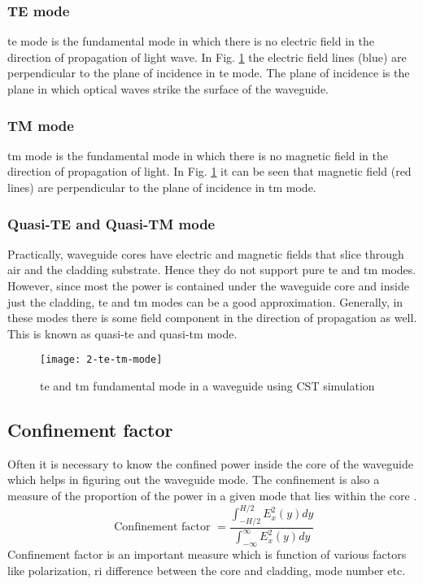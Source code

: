 \documentclass[../report.tex]{subfiles}
\begin{document}
			\subsubsection{TE mode}
\gls{te} mode is the fundamental mode in which there is no electric field in the direction of propagation of light wave. In Fig. \ref{fig:2_te_tm_mode} the electric field lines (blue) are perpendicular to the plane of incidence in \gls{te} mode. The plane of incidence is the plane in which optical waves strike the surface of the waveguide.						
			\subsubsection{TM mode}
\gls{tm} mode is the fundamental mode in which there is no magnetic field in the direction of propagation of light. In Fig. \ref{fig:2_te_tm_mode} it can be seen that magnetic field (red lines) are perpendicular to the plane of incidence in \gls{tm} mode.
 
			\subsubsection{Quasi-TE and Quasi-TM mode}				
Practically, waveguide cores have electric and magnetic fields that slice through air and the cladding substrate. Hence they do not support pure \gls{te} and \gls{tm} modes. However, since most the power is contained under the waveguide core and inside just the cladding, \gls{te} and \gls{tm} modes can be a good approximation. Generally, in these modes there is some field component in the direction of propagation as well. This is known as quasi-\gls{te} and quasi-\gls{tm} mode.

\begin{figure}[H]
	\centering
	\texttt{[image: 2-te-tm-mode]}
	\caption{\gls{te} and \gls{tm} fundamental mode in a waveguide using CST simulation}
	\label{fig:2_te_tm_mode}
\end{figure}
			
		\subsection{Confinement factor}
Often it is necessary to know the confined power inside the core of the waveguide which helps in figuring out the waveguide mode. The confinement is also a measure of the proportion of the power in a given mode that lies within the core \cite{reed_silicon_2008}.  
\begin{equation}\label{eq:per}
\text{ Confinement factor } = \dfrac {\int _{-H / 2}^{H/2}E_{x}^{2}\left( y\right) dy} {\int _{-\infty }^{\infty }E_{x}^{2}\left( y\right) dy}
\end{equation}
Confinement factor is an important measure which is function of various factors like polarization, \gls{ri} difference between the core and cladding, mode number etc.	
		
\end{document}
